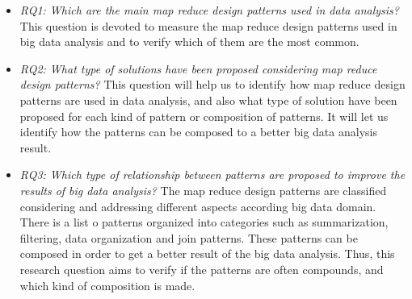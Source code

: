 \begin{itemize}
\item {\em RQ1: Which are the main map reduce design patterns used in data
analysis?} This question is devoted to measure the map reduce design patterns
used in big data analysis and to verify which of them are the most common.

\item {\em RQ2: What type of solutions have been proposed considering map
reduce design patterns?} This question will help us to identify how map reduce
design patterns are used in data analysis, and also
what type of solution have been proposed for each kind of pattern or
composition of patterns. It will let us identify how the patterns can be
composed to a better big data analysis result.
 
\item  {\em RQ3: Which type of relationship between patterns are proposed to
improve the results of big data analysis?} The map reduce design patterns are
classified considering and addressing different aspects
according big data domain. There is a list o patterns organized into categories
such as summarization, filtering, data organization and join patterns. These
patterns can be composed in order to get a better result of the big data
analysis. Thus, this research question aims to verify if the patterns are often
compounds, and which kind of composition is made.


\end{itemize}

% 
%  
% 
% 

